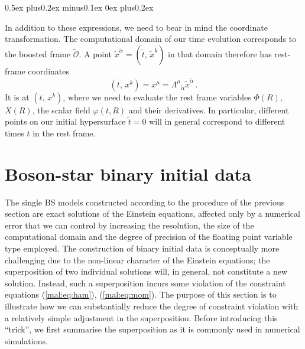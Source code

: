\begin{list}{\rm{\bf ()}}{
                
             \parsep0.5ex plus0.2ex minus0.1ex \itemsep0ex plus0.2ex}
  \item In addition to these expressions, we need to bear in mind the coordinate
  transformation. The computational domain of our time evolution corresponds
  to the boosted frame $\tilde{\mathcal{O}}$. A
  point $\tilde{x}^{\tilde{\alpha}}=(\tilde{t},\,\tilde{x}^{\tilde{k}})$
  in that domain therefore has rest-frame coordinates
  \begin{equation}
     (t,\,x^k) = x^{\mu} = \Lambda^{\mu}{}_{\tilde{\alpha}}\tilde{x}^{\tilde{\alpha}}\,.
  \end{equation}
  It is at $(t,\,x^k)$, where we need to evaluate the rest frame variables
  $\Phi(R)$, $X(R)$, the scalar field $\varphi(t,R)$ and their
  derivatives. In particular, different points on our initial
  hypersurface $\tilde{t}=0$ will in general correspond to different
  times $t$ in the rest frame.
\end{list}
%

\section{Boson-star binary initial data}
\label{mal:sec:superposition}
%
The single BS models constructed according to the procedure of the
previous section are exact solutions of the Einstein equations, affected
only by a numerical error that we can control by increasing the resolution,
the size of the computational domain and the degree of precision of the floating
point variable type employed. The construction of binary initial data is
conceptually more challenging due to the non-linear character of the
Einstein equations; the superposition of two individual solutions will,
in general, not constitute a new solution. Instead, such a superposition
incurs some violation of the constraint equations (\ref{mal:eq:ham}),
(\ref{mal:eq:mom}). The purpose of this section is to illustrate
how we can substantially reduce the degree of constraint
violation with a relatively simple adjustment in the
superposition. Before introducing this ``trick'', we first
summarise the superposition as it is commonly used in numerical
simulations.

